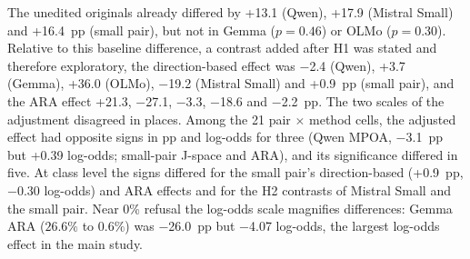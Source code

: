 The unedited originals already differed by +13.1 (Qwen), +17.9 (Mistral
Small) and +16.4~pp (small pair), but not in Gemma ($p=0.46$) or OLMo
($p=0.30$). Relative to this baseline difference, a contrast added after H1
was stated and therefore exploratory, the direction-based effect was $-$2.4
(Qwen), +3.7 (Gemma), +36.0 (OLMo), $-$19.2 (Mistral Small) and +0.9~pp (small
pair), and the ARA effect +21.3, $-$27.1, $-$3.3, $-$18.6 and $-$2.2~pp. The
two scales of the adjustment disagreed in places. Among the 21 pair $\times$
method cells, the adjusted effect had opposite signs in pp and log-odds for
three (Qwen MPOA, $-$3.1~pp but +0.39 log-odds; small-pair J-space and ARA),
and its significance differed in five. At class level the signs differed for
the small pair's direction-based (+0.9~pp, $-$0.30 log-odds) and ARA effects
and for the H2 contrasts of Mistral Small and the small pair. Near 0\%
refusal the log-odds scale magnifies differences: Gemma ARA ($26.6\%$ to
$0.6\%$) was $-$26.0~pp but $-$4.07 log-odds, the largest log-odds effect in
the main study.

